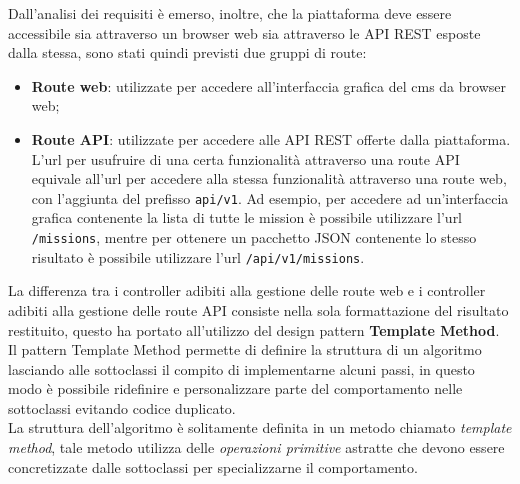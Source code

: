 Dall'analisi dei requisiti è emerso, inoltre, che la piattaforma deve essere accessibile sia attraverso un browser web sia attraverso le API REST esposte dalla stessa, sono stati quindi previsti due gruppi di route:

\begin{itemize}
	\item \textbf{Route web}: utilizzate per accedere all'interfaccia grafica del \gls{cms}\glsfirstoccur{} da browser web; 
	\item \textbf{Route API}: utilizzate per accedere alle API REST offerte dalla piattaforma. L'\gls{url}\glsfirstoccur{} per usufruire di una certa funzionalità attraverso una route API equivale all'\gls{url}\glsfirstoccur{} per accedere alla stessa funzionalità attraverso una route web, con l'aggiunta del prefisso \verb!api/v1!. Ad esempio, per accedere ad un'interfaccia grafica contenente la lista di tutte le mission è possibile utilizzare l'\gls{url}\glsfirstoccur{} \verb!/missions!, mentre per ottenere un pacchetto JSON contenente lo stesso risultato è possibile utilizzare l'\gls{url}\glsfirstoccur{} \verb!/api/v1/missions!.
\end{itemize}

La differenza tra i controller adibiti alla gestione delle route web e i controller adibiti alla gestione delle route API consiste nella sola formattazione del risultato restituito, questo ha portato all'utilizzo del design pattern \textbf{Template Method}. Il pattern Template Method permette di definire la struttura di un algoritmo lasciando alle sottoclassi il compito di implementarne alcuni passi, in questo modo è possibile ridefinire e personalizzare parte del comportamento nelle sottoclassi evitando codice duplicato. \\ 
La struttura dell'algoritmo è solitamente definita in un metodo chiamato \textit{template method}, tale metodo utilizza delle \textit{operazioni primitive} astratte che devono essere concretizzate dalle sottoclassi per specializzarne il comportamento. 

